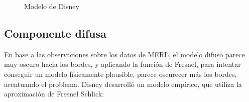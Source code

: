     \begin{figure}[H]
        \vspace{0.5cm}
        \centering
        \caption{Modelo de Disney}
    \end{figure}
        
        \subsection{Componente difusa}
    
        En base a las observaciones sobre los datos de MERL, el modelo difuso parece muy oscuro hacia los bordes, y aplicando
        la funci\'on de Fresnel, para intentar conseguir un modelo f\'isicamente plausible, parece oscurecer m\'as los bordes,
        acentuando el problema. Disney desarroll\'o un modelo emp\'irico, que utiliza la aproximaci\'on de Fresnel Schlick:
    
